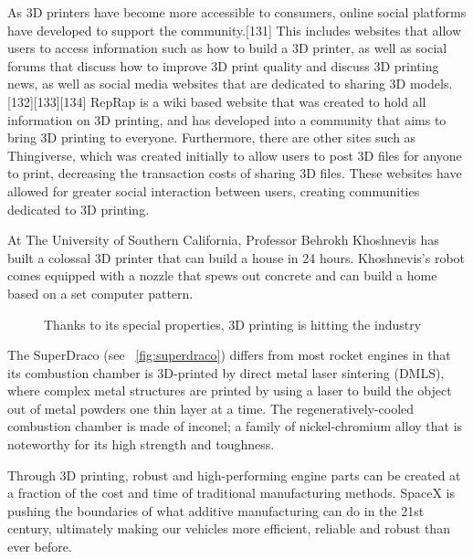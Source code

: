 As 3D printers have become more accessible to consumers, online social platforms have developed to support the community.[131] This includes websites that allow users to access information such as how to build a 3D printer, as well as social forums that discuss how to improve 3D print quality and discuss 3D printing news, as well as social media websites that are dedicated to sharing 3D models.[132][133][134]
RepRap is a wiki based website that was created to hold all information on 3D printing, and has developed into a community that aims to bring 3D printing to everyone. Furthermore, there are other sites such as Thingiverse, which was created initially to allow users to post 3D files for anyone to print, decreasing the transaction costs of sharing 3D files. These websites have allowed for greater social interaction between users, creating communities dedicated to 3D printing.

At The University of Southern California, Professor Behrokh Khoshnevis has built a colossal 3D printer that can build a house in 24 hours. Khoshnevis's robot comes equipped with a nozzle that spews out concrete and can build a home based on a set computer pattern.



\begin{figure}[ht]
\centering
    \hfil
    \caption{Thanks to its special properties, 3D printing is hitting the industry}
    \label{fig:industrie_printing}
\end{figure}

The SuperDraco (see \figurename~\ref{fig:superdraco}) differs from most rocket engines in that its combustion chamber is 3D-printed by direct metal laser sintering (DMLS), where complex metal structures are printed by using a laser to build the object out of metal powders one thin layer at a time. The regeneratively-cooled combustion chamber is made of inconel; a family of nickel-chromium alloy that is noteworthy for its high strength and toughness.

\begin{formal}
    Through 3D printing, robust and high-performing engine parts can be created at a fraction of the cost and time of traditional manufacturing methods. SpaceX is pushing the boundaries of what additive manufacturing can do in the 21st century, ultimately making our vehicles more efficient, reliable and robust than ever before.
\end{formal}


